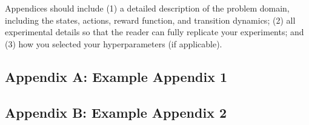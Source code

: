 \documentclass{article}
\begin{document}
Appendices should include (1) a detailed description of the problem domain,
including the states, actions, reward function, and transition dynamics; (2) all experimental
details so that the reader can fully replicate your experiments; and (3) how you selected your
hyperparameters (if applicable).
\subsection*{Appendix A: Example Appendix 1}
\subsection*{Appendix B: Example Appendix 2}
\end{document}
